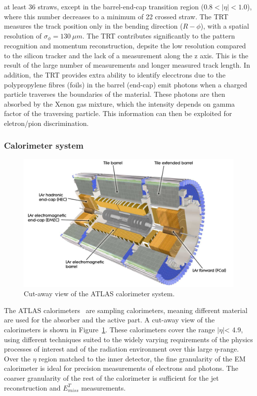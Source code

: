 \begin{itemize}
	at least 36 straws, except in the
	barrel-end-cap transition region ($0.8 < |\eta|< 1.0$), 
	where this number decreases to a minimum of 22 crossed straw.
	The TRT measures the track position only in the bending direction
	($R-\phi$), with a spatial resolution of $\sigma_\phi = 130\ \mu m$.
	The TRT contributes significantly to the pattern recognition and 
	momentum reconstruction, depsite the low resolution compared to the 
	silicon tracker and the lack of a measurement along the z axis. 
	This is the result of the large number of measurements and longer
	measured track length. In addition, the TRT provides extra ability to 
	identify elecctrons due to the polypropylene fibres (foils) in the barrel
	(end-cap) emit photons when a charged particle traverses the boundaries of
	the material. These photons are then absorbed by the Xenon gas mixture, which
	the intensity depends on gamma factor of the traversing particle. 
	This information can then be exploited for eletron/pion discrimination.
	\end{itemize}

	\subsubsection{Calorimeter system}



	\begin{figure}[bht]
		\begin{centering}	
		\includegraphics[width=.6\textwidth]{Detector_plots/calo.png}
		\caption{Cut-away view of the ATLAS calorimeter system.}
		\label{fig:calo}
		\end{centering}
	\end{figure}

	The ATLAS calorimeters~\cite{ATLAS-TDR-01}
	are sampling calorimeters, meaning
	different material are used for the absorber and the active part.
	A cut-away view of the calorimeters is shown in Figure~\ref{fig:calo}.
	These calorimeters cover the range $|\eta|$< 4.9, using 
	different techniques suited to the widely varying requirements 
	of the physics processes of interest and of the radiation environment
	over this large $\eta$-range. Over the $\eta$ region matched to 
	the inner detector, the fine granularity of	the EM calorimeter 
	is ideal for precision measurements of electrons and photons. The
	coarser granularity of the rest of the calorimeter is sufficient 
	for the jet reconstruction and $E_{miss}^T$ measurements.

